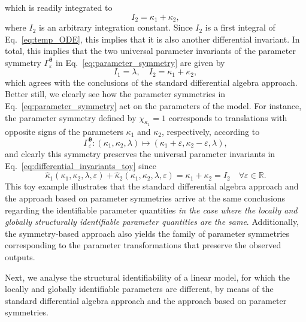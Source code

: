 \documentclass[12pt]{article}
\begin{document}
which is readily integrated to
\begin{equation}
    I_{2}=\kappa_{1}+\kappa_{2},
    \label{eq:temp_solution}
\end{equation}
where $I_{2}$ is an arbitrary integration constant. Since $I_{2}$ is a first integral of Eq.~\eqref{eq:temp_ODE}, this implies that it is also another differential invariant. In total, this implies that the two universal parameter invariants of the parameter symmetry $\Gamma_{\varepsilon}^{\boldsymbol{\theta}}$ in Eq.~\eqref{eq:parameter_symmetry} are given by
\begin{equation}
    I_{1}=\lambda,\quad I_{2}=\kappa_{1}+\kappa_{2},
\label{eq:differential_invariants_toy}
\end{equation}
which agrees with the conclusions of the standard differential algebra approach. Better still, we clearly see how the parameter symmetries in Eq.~\eqref{eq:parameter_symmetry} act on the parameters of the model. For instance, the parameter symmetry defined by $\chi_{\kappa_{1}}=1$ corresponds to translations with opposite signs of the parameters $\kappa_{1}$ and $\kappa_{2}$, respectively, according to
\begin{equation}
    \Gamma_{\varepsilon}^{\boldsymbol{\theta}}:(\kappa_{1},\kappa_{2},\lambda)\mapsto(\kappa_{1}+\varepsilon,\kappa_{2}-\varepsilon,\lambda),
    \label{eq:parameter_symmetry_toy}
\end{equation}
and clearly this symmetry preserves the universal parameter invariants in Eq.~\eqref{eq:differential_invariants_toy} since
\begin{equation}
\hat{\kappa}_{1}(\kappa_{1},\kappa_{2},\lambda,\varepsilon)+\hat{\kappa}_{2}(\kappa_{1},\kappa_{2},\lambda,\varepsilon)=\kappa_{1}+\kappa_{2}=I_{2}\quad\forall\varepsilon\in\mathbb{R}.
  \label{eq:toy_preserve_invariants}
\end{equation}
This toy example illustrates that the standard differential algebra approach and the approach based on parameter symmetries arrive at the same conclusions regarding the identifiable parameter quantities \textit{in the case where the locally and globally structurally identifiable parameter quantities are the same}. Additionally, the symmetry-based approach also yields the family of parameter symmetries corresponding to the parameter transformations that preserve the observed outputs. 

Next, we analyse the structural identifiability of a linear model, for which the locally and globally identifiable parameters are different, by means of the standard differential algebra approach and the approach based on parameter symmetries.
\end{document}

